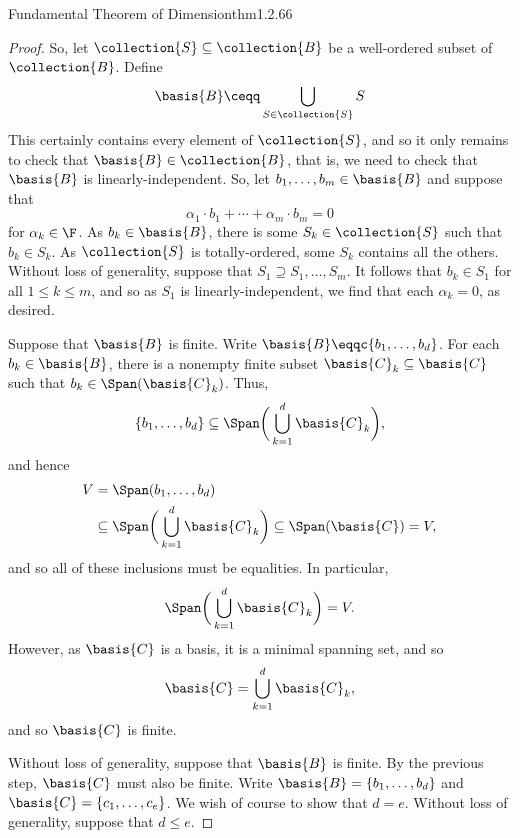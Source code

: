 \begin{thm}{Fundamental Theorem of Dimension}{thm1.2.66}
\begin{proof}
		So, let $\collection{S}\subseteq \collection{B}$ be a well-ordered subset of $\collection{B}$.  Define
		\begin{equation}
			\basis{B}\ceqq \bigcup _{S\in \collection{S}}S
		\end{equation}
		This certainly contains every element of $\collection{S}$, and so it only remains to check that $\basis{B}\in \collection{B}$, that is, we need to check that $\basis{B}$ is linearly-independent.  So, let $b_1,\ldots ,b_m\in \basis{B}$ and suppose that
		\begin{equation}
			\alpha _1\cdot b_1+\cdots +\alpha _m\cdot b_m=0
		\end{equation}
		for $\alpha _k\in \F$.  As $b_k\in \basis{B}$, there is some $S_k\in \collection{S}$ such that $b_k\in S_k$.  As $\collection{S}$ is totally-ordered, some $S_k$ contains all the others.  Without loss of generality, suppose that $S_1\supseteq S_1,\ldots ,S_m$.  It follows that $b_k\in S_1$ for all $1\leq k\leq m$, and so as $S_1$ is linearly-independent, we find that each $\alpha _k=0$, as desired.
		
		Suppose that $\basis{B}$ is finite.  Write $\basis{B}\eqqc \{ b_1,\ldots ,b_d\}$.  For each $b_k\in \basis{B}$, there is a nonempty finite subset $\basis{C}_k\subseteq \basis{C}$ such that $b_k\in \Span (\basis{C}_k)$.  Thus,
		\begin{equation}
			\{ b_1,\ldots ,b_d\} \subseteq \Span \bigg( \bigcup _{k=1}^d\basis{C}_k\bigg) ,
		\end{equation}
		and hence
		\begin{equation}
			\begin{split}
				V & =\Span (b_1,\ldots ,b_d) \\
				& \subseteq \Span \bigg( \bigcup _{k=1}^d\basis{C}_k\bigg) \subseteq \Span (\basis{C})=V,
			\end{split}
		\end{equation}
		and so all of these inclusions must be equalities.  In particular,
		\begin{equation}
			\Span \bigg( \bigcup _{k=1}^d\basis{C}_k\bigg) =V.
		\end{equation}
		However, as $\basis{C}$ is a basis, it is a minimal spanning set, and so
		\begin{equation}
			\basis{C}=\bigcup _{k=1}^d\basis{C}_k,
		\end{equation}
		and so $\basis{C}$ is finite.
		
		Without loss of generality, suppose that $\basis{B}$ is finite.  By the previous step, $\basis{C}$ must also be finite.  Write $\basis{B}=\{ b_1,\ldots ,b_d\}$ and $\basis{C}=\{ c_1,\ldots ,c_e\}$.  We wish of course to show that $d=e$.  Without loss of generality, suppose that $d\leq e$.
		

\end{proof}
\end{thm}
